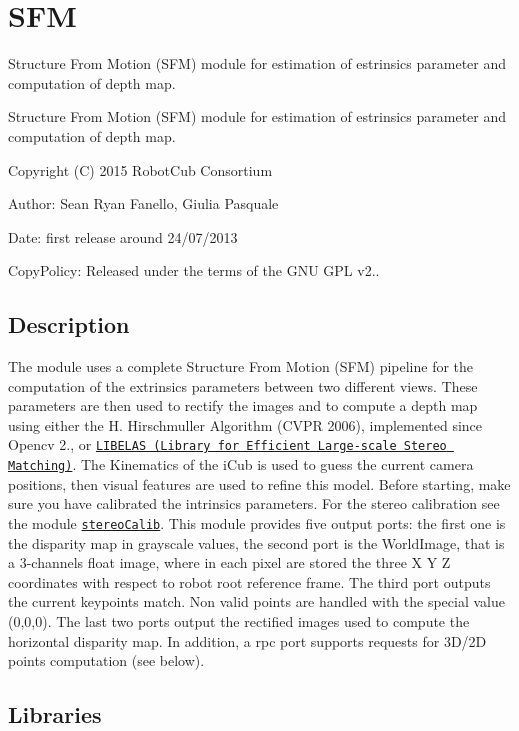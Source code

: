 \section{S\+F\+M}
\label{group__SFM}


Structure From Motion (S\+F\+M) module for estimation of estrinsics parameter and computation of depth map.  


Structure From Motion (S\+F\+M) module for estimation of estrinsics parameter and computation of depth map. 

Copyright (C) 2015 Robot\+Cub Consortium

Author\+: Sean Ryan Fanello, Giulia Pasquale

Date\+: first release around 24/07/2013

Copy\+Policy\+: Released under the terms of the G\+N\+U G\+P\+L v2..\hypertarget{group__SFM_intro_sec}{}\subsection{Description}\label{group__SFM_intro_sec}
The module uses a complete Structure From Motion (S\+F\+M) pipeline for the computation of the extrinsics parameters between two different views. These parameters are then used to rectify the images and to compute a depth map using either the H. Hirschmuller Algorithm (C\+V\+P\+R 2006), implemented since Opencv 2., or \href{http://www.cvlibs.net/software/libelas/}{\tt L\+I\+B\+E\+L\+A\+S (Library for Efficient Large-\/scale Stereo Matching)}. The Kinematics of the i\+Cub is used to guess the current camera positions, then visual features are used to refine this model. Before starting, make sure you have calibrated the intrinsics parameters. For the stereo calibration see the module \href{http://wiki.icub.org/iCub/main/dox/html/group__icub__stereoCalib.html}{\tt stereo\+Calib}. This module provides five output ports\+: the first one is the disparity map in grayscale values, the second port is the World\+Image, that is a 3-\/channels float image, where in each pixel are stored the three X Y Z coordinates with respect to robot root reference frame. The third port outputs the current keypoints match. Non valid points are handled with the special value (0,0,0). The last two ports output the rectified images used to compute the horizontal disparity map. In addition, a rpc port supports requests for 3\+D/2\+D points computation (see below).\hypertarget{group__SFM_lib_sec}{}\subsection{Libraries}\label{group__SFM_lib_sec}
